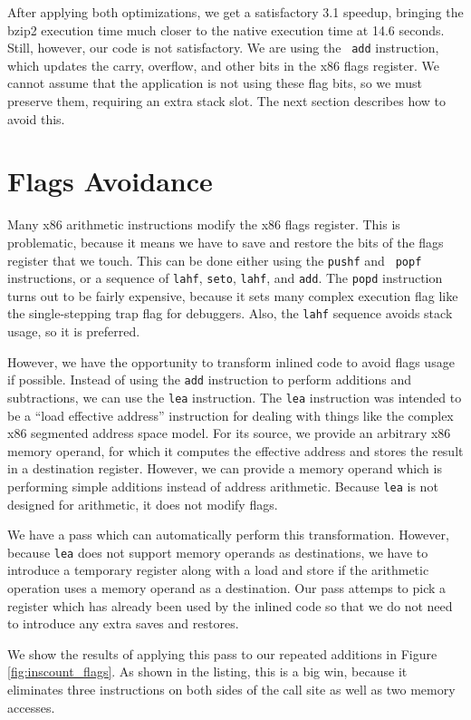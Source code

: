 After applying both optimizations, we get a satisfactory 3.1 speedup, bringing
the bzip2 execution time much closer to the native execution time at 14.6
seconds.  Still, however, our code is not satisfactory.  We are using the {\tt
add} instruction, which updates the carry, overflow, and other bits in the x86
flags register.  We cannot assume that the application is not using these flag
bits, so we must preserve them, requiring an extra stack slot.  The next
section describes how to avoid this.

\section{Flags Avoidance}

Many x86 arithmetic instructions modify the x86 flags register.  This is
problematic, because it means we have to save and restore the bits of the flags
register that we touch.  This can be done either using the {\tt pushf} and {\tt
popf} instructions, or a sequence of {\tt lahf}, {\tt seto}, {\tt lahf}, and
{\tt add}.  The {\tt popd} instruction turns out to be fairly expensive, because
it sets many complex execution flag like the single-stepping trap flag for
debuggers.  Also, the {\tt lahf} sequence avoids stack usage, so it is
preferred.

However, we have the opportunity to transform inlined code to avoid flags usage
if possible.  Instead of using the {\tt add} instruction to perform additions
and subtractions, we can use the {\tt lea} instruction.  The {\tt lea}
instruction was intended to be a ``load effective address'' instruction for
dealing with things like the complex x86 segmented address space model.  For its
source, we provide an arbitrary x86 memory operand, for which it computes the
effective address and stores the result in a destination register.  However, we
can provide a memory operand which is performing simple additions instead of
address arithmetic.  Because {\tt lea} is not designed for arithmetic, it does
not modify flags.

We have a pass which can automatically perform this transformation.  However,
because {\tt lea} does not support memory operands as destinations, we have to
introduce a temporary register along with a load and store if the arithmetic
operation uses a memory operand as a destination.  Our pass attemps to pick a
register which has already been used by the inlined code so that we do not need
to introduce any extra saves and restores.

We show the results of applying this pass to our repeated additions in Figure
\ref{fig:inscount_flags}.  As shown in the listing, this is a big win, because
it eliminates three instructions on both sides of the call site as well as two
memory accesses.

